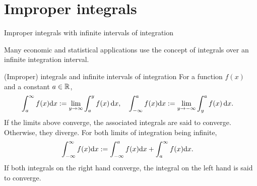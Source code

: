 \documentclass[9pt]{beamer}
\begin{document}
\section{Improper integrals}

\begin{frame}{Improper integrals with infinite intervals of integration}

    Many economic and statistical applications use the concept of integrals over an infinite integration interval.

    \begin{block}{(Improper) integrals and infinite intervals of integration}
    For a function $f(x)$ and a constant $a\in\mathbb{R}$,
        \begin{align*}
            \int_a^\infty f(x)\mathrm{d} x &:= \lim_{y\rightarrow \infty} \int_a^y f(x)\,\mathrm{d} x,\quad
            \int_{-\infty}^a f(x)\mathrm{d} x := \lim_{y\rightarrow -\infty} \int_y^a f(x)\,\mathrm{d} x.
        \end{align*}
    If the limits above converge, the associated integrals are said to converge. Otherwise, they diverge. For both limits of integration being infinite,
    \begin{align*}
            \int_{-\infty}^\infty f(x)\mathrm{d} x &:= \int_{-\infty}^a f(x)\mathrm{d} x + \int_a^\infty f(x)\mathrm{d} x.
    \end{align*}
    If both integrals on the right hand converge, the integral on the left hand is said to converge.
    \end{block}

\end{frame}
\end{document}
